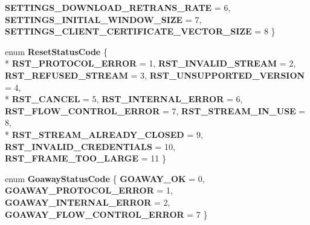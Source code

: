 \begin{DoxyCompactItemize}
{\bf S\+E\+T\+T\+I\+N\+G\+S\+\_\+\+D\+O\+W\+N\+L\+O\+A\+D\+\_\+\+R\+E\+T\+R\+A\+N\+S\+\_\+\+R\+A\+TE} = 6, 
{\bf S\+E\+T\+T\+I\+N\+G\+S\+\_\+\+I\+N\+I\+T\+I\+A\+L\+\_\+\+W\+I\+N\+D\+O\+W\+\_\+\+S\+I\+ZE} = 7, 
{\bf S\+E\+T\+T\+I\+N\+G\+S\+\_\+\+C\+L\+I\+E\+N\+T\+\_\+\+C\+E\+R\+T\+I\+F\+I\+C\+A\+T\+E\+\_\+\+V\+E\+C\+T\+O\+R\+\_\+\+S\+I\+ZE} = 8
 \}
\item 
enum {\bf Reset\+Status\+Code} \{ \\*
{\bf R\+S\+T\+\_\+\+P\+R\+O\+T\+O\+C\+O\+L\+\_\+\+E\+R\+R\+OR} = 1, 
{\bf R\+S\+T\+\_\+\+I\+N\+V\+A\+L\+I\+D\+\_\+\+S\+T\+R\+E\+AM} = 2, 
{\bf R\+S\+T\+\_\+\+R\+E\+F\+U\+S\+E\+D\+\_\+\+S\+T\+R\+E\+AM} = 3, 
{\bf R\+S\+T\+\_\+\+U\+N\+S\+U\+P\+P\+O\+R\+T\+E\+D\+\_\+\+V\+E\+R\+S\+I\+ON} = 4, 
\\*
{\bf R\+S\+T\+\_\+\+C\+A\+N\+C\+EL} = 5, 
{\bf R\+S\+T\+\_\+\+I\+N\+T\+E\+R\+N\+A\+L\+\_\+\+E\+R\+R\+OR} = 6, 
{\bf R\+S\+T\+\_\+\+F\+L\+O\+W\+\_\+\+C\+O\+N\+T\+R\+O\+L\+\_\+\+E\+R\+R\+OR} = 7, 
{\bf R\+S\+T\+\_\+\+S\+T\+R\+E\+A\+M\+\_\+\+I\+N\+\_\+\+U\+SE} = 8, 
\\*
{\bf R\+S\+T\+\_\+\+S\+T\+R\+E\+A\+M\+\_\+\+A\+L\+R\+E\+A\+D\+Y\+\_\+\+C\+L\+O\+S\+ED} = 9, 
{\bf R\+S\+T\+\_\+\+I\+N\+V\+A\+L\+I\+D\+\_\+\+C\+R\+E\+D\+E\+N\+T\+I\+A\+LS} = 10, 
{\bf R\+S\+T\+\_\+\+F\+R\+A\+M\+E\+\_\+\+T\+O\+O\+\_\+\+L\+A\+R\+GE} = 11
 \}
\item 
enum {\bf Goaway\+Status\+Code} \{ {\bf G\+O\+A\+W\+A\+Y\+\_\+\+OK} = 0, 
{\bf G\+O\+A\+W\+A\+Y\+\_\+\+P\+R\+O\+T\+O\+C\+O\+L\+\_\+\+E\+R\+R\+OR} = 1, 
{\bf G\+O\+A\+W\+A\+Y\+\_\+\+I\+N\+T\+E\+R\+N\+A\+L\+\_\+\+E\+R\+R\+OR} = 2, 
{\bf G\+O\+A\+W\+A\+Y\+\_\+\+F\+L\+O\+W\+\_\+\+C\+O\+N\+T\+R\+O\+L\+\_\+\+E\+R\+R\+OR} = 7
 \}
\end{DoxyCompactItemize}
